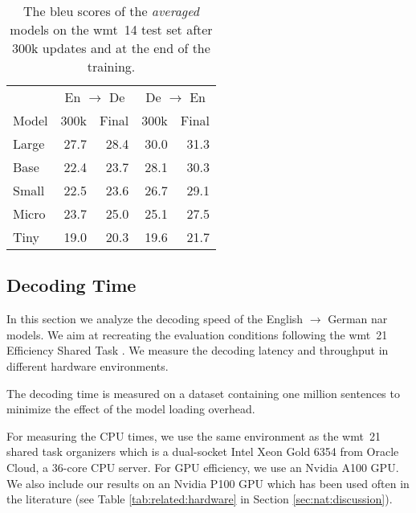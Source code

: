 \begin{table}
  \centering

  \begin{tabular}{lrrrr}
    \toprule
    & \multicolumn{2}{c}{En $\rightarrow$ De}
    & \multicolumn{2}{c}{De $\rightarrow$ En} \\
    Model
    & 300k & Final & 300k &  Final \\
    \midrule

    Large & 27.7 & 28.4 & 30.0 & 31.3 \\
    Base  & 22.4 & 23.7 & 28.1 & 30.3 \\
    Small & 22.5 & 23.6 & 26.7 & 29.1 \\
    Micro & 23.7 & 25.0 & 25.1 & 27.5 \\
    Tiny  & 19.0 & 20.3 & 19.6 & 21.7 \\

    \bottomrule
  \end{tabular}

  \caption{The \acs{bleu} scores of the \emph{averaged} models on the
    \acs{wmt}~14 test set after 300k updates and at the end of the training.}%
  \label{tab:wmt14-weight-avg}

\end{table}


\subsection{Decoding Time}%
\label{subsec:results:time}

In this section we analyze the decoding speed of the English $\rightarrow$
German \ac{nar} models. We aim at recreating the evaluation conditions
following the \acs{wmt}~21 Efficiency Shared Task
\citep{heafield-etal-2021-findings}. We measure the decoding latency and
throughput in different hardware environments.

The decoding time is measured on a dataset containing one million sentences to
minimize the effect of the model loading overhead.

For measuring the CPU times, we use the same environment as the \acs{wmt}~21
shared task organizers which is a dual-socket Intel Xeon Gold 6354 from Oracle
Cloud, a 36-core CPU server. For GPU efficiency, we use an Nvidia A100 GPU.
We also include our results on an Nvidia P100 GPU which has been used often in
the literature (see Table \ref{tab:related:hardware} in Section
\ref{sec:nat:discussion}).

